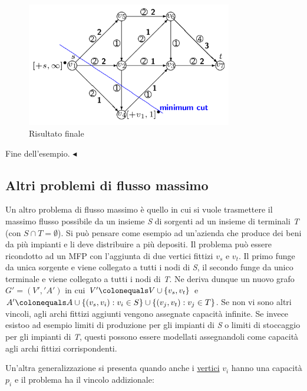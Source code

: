 \documentclass[11pt]{book}
\begin{document}
\begin{itemize}
\begin{figure}[h!]
  \centering
  \includegraphics[width=0.8\textwidth]{images/cap7figura784.png}
  \caption{Risultato finale}
  \label{cap7figura784}
\end{figure}

\end{itemize}

Fine dell'esempio. $\blacktriangleleft$
\vspace{11pt}

\subsection{Altri problemi di flusso massimo}

Un altro problema di flusso massimo \`e quello in cui si vuole
trasmettere il massimo flusso possibile da un insieme {\em S} di
sorgenti ad un insieme di terminali {\em T} (con $S \cap T =
\emptyset$). Si pu\`o pensare come esempio ad un'azienda che produce
dei beni da pi\`u impianti e li deve distribuire a pi\`u depositi. Il
problema pu\`o essere ricondotto ad un MFP con l'aggiunta di due
vertici fittizi $v_s$ e $v_t$. Il primo funge da unica sorgente e
viene collegato a tutti i nodi di {\em S}, il secondo funge da unico
terminale e viene collegato a tutti i nodi di {\em T}. Ne deriva
dunque un nuovo grafo $G' = (V','A')$ in cui $V' \colonequals V \cup
\{ v_s, v_t\}$ e $A' \colonequals A \cup \{ (v_s, v_i) : v_i \in S\}
\cup \{ (v_j, v_t) : v_j \in T\}$. Se non vi sono altri vincoli, agli
archi fittizi aggiunti vengono assegnate capacit\`a infinite. Se
invece esistoo ad esempio limiti di produzione per gli impianti di
{\em S} o limiti di stoccaggio per gli impianti di {\em T}, questi
possono essere modellati assegnandoli come capacit\`a agli archi
fittizi corrispondenti.

Un'altra generalizzazione si presenta quando anche i
\underline{vertici} $v_i$ hanno una capacit\`a $p_i$ e il problema ha
il vincolo addizionale:
\end{document}
